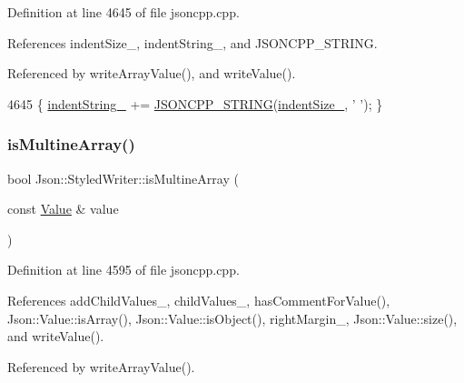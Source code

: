 Definition at line 4645 of file jsoncpp.\+cpp.



References indent\+Size\+\_\+, indent\+String\+\_\+, and J\+S\+O\+N\+C\+P\+P\+\_\+\+S\+T\+R\+I\+NG.



Referenced by write\+Array\+Value(), and write\+Value().


\begin{DoxyCode}
4645 \{ \hyperlink{class_json_1_1_styled_writer_a7d91709c94c152bd44eaf80faac130ae}{indentString\_} += \hyperlink{json_8h_a1e723f95759de062585bc4a8fd3fa4be}{JSONCPP\_STRING}(\hyperlink{class_json_1_1_styled_writer_a0b5ab768cc56433d463eb1f03da8614e}{indentSize\_}, \textcolor{charliteral}{' '}); \}
\end{DoxyCode}
\mbox{\label{class_json_1_1_styled_writer_aa5dc671edf10b9976f1511da2271ab9d}} 
\subsubsection{\texorpdfstring{is\+Multine\+Array()}{isMultineArray()}}
{\footnotesize\ttfamily bool Json\+::\+Styled\+Writer\+::is\+Multine\+Array (\begin{DoxyParamCaption}\item[{const \hyperlink{class_json_1_1_value}{Value} \&}]{value }\end{DoxyParamCaption})\hspace{0.3cm}{\ttfamily [private]}}



Definition at line 4595 of file jsoncpp.\+cpp.



References add\+Child\+Values\+\_\+, child\+Values\+\_\+, has\+Comment\+For\+Value(), Json\+::\+Value\+::is\+Array(), Json\+::\+Value\+::is\+Object(), right\+Margin\+\_\+, Json\+::\+Value\+::size(), and write\+Value().



Referenced by write\+Array\+Value().


